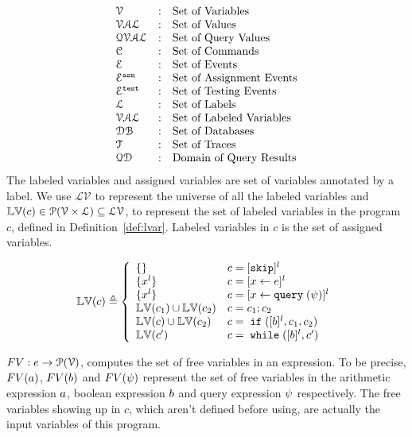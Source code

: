 \[
\begin{array}{lll}
\mathcal{V} & : & \mbox{Set of Variables}  
\\ 
%
\mathcal{VAL} & : & \mbox{Set of Values} 
\\ 
%
\mathcal{QVAL} & : & \mbox{Set of Query Values} 
\\ 
%
\cdom & : & \mbox{Set of Commands} 
\\ 
%
\eventset  & : & \mbox{Set of Events}  
\\
%
\eventset^{\asn}  & : & \mbox{Set of Assignment Events}  
\\
%
\eventset^{\test}  & : & \mbox{Set of Testing Events}  
\\
%
\ldom  & : & \mbox{Set of Labels}  
\\
\mathcal{VAL}  & : & \mbox{Set of Labeled Variables}  
\\
\dbdom  & : & \mbox{{Set of Databases}} 
\\
%
{\mathcal{T}} & : & \mbox{Set of Traces}
\\
%
\qdom & : & \mbox{{Domain of Query Results}}\\
\end{array}
\]
%
The labeled variables and assigned variables are set of variables annotated by a label. 
We use  
$\mathcal{LV}$ to represent the universe of all the labeled variables and 
$\mathbb{LV}(c) \in \mathcal{P}(\mathcal{V} \times \mathcal{L}) \subseteq \mathcal{LV}$,
to represent the set of labeled variables in the program $c$,
defined in Definition~\ref{def:lvar}.
Labeled variables in $c$ is the set of assigned variables.
%
%
\begin{defn}
  \label{def:lvar}
  {\footnotesize
  $$
    \lvar(c) \triangleq
    \left\{
    \begin{array}{ll}
      \{ \}           
        & {c} = [{\eskip}]^{l} 
        \\
      \{{x}^l\}           
        & {c} = [{\assign x e}]^{l} 
        \\
        \{{x}^l\}            
        & {c} = [{\assign x \query(\qexpr)}]^{l} 
        \\
        \lvar(c_1) \cup \lvar(c_2) 
        & {c} = {c_1};{c_2}
        \\
        \lvar(c) \cup \lvar(c_2)
        & {c} =\eif([\bexpr]^{l}, c_1, c_2) 
        \\
        \lvar(c')
        & {c}   = \ewhile ([\bexpr]^{l}, {c}')
  \end{array}
  \right.
  $$
  }
  \end{defn}
  $FV: e \to \mathcal{P}(\mathcal{V})$, computes the set of free variables in an expression. To be precise,
  $FV(a)$, $FV(b)$ and $FV(\psi)$ represent the set of
  free variables in the arithmetic
  expression $a$, boolean expression $b$ and query expression $\psi$ respectively.
  The free variables
  showing up in $c$, which aren't defined before using, are actually the input variables of this program.
  
